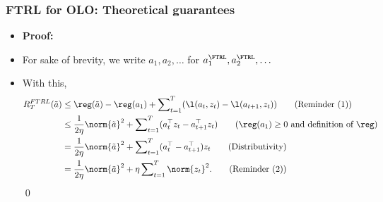 \documentclass[11pt,compress,t,notes=noshow, xcolor=table]{beamer}
\begin{document}
\begin{frame} 
	\frametitle{FTRL for OLO: Theoretical guarantees}
	\small
	\begin{itemize}
		\footnotesize

		\item \textbf{Proof:}
		
		\footnotesize
			
			 \item 	For sake of brevity, we write $a_1, a_2, \ldots$ for $a_1^{\FTRL}, a_2^{\FTRL}, \ldots$ 
			\pause
			 \item With this,
			\begin{align*}
				R_T^{FTRL}(\tilde a) &\leq \reg(\tilde a) - \reg(a_1) + \sum\nolimits_{t=1}^T (\l(a_t,z_t) - \l(a_{t+1},z_t))  \tag{Reminder (1)}\\
				 &\leq \frac{1}{2\eta}  \norm{\tilde a}^2 + \sum\nolimits_{t=1}^T ( a_t^\top z_t  -  a_{t+1}^\top z_t  ) \tag{$\reg(a_1)\geq 0$ and definition of $\reg$} \\
				 &= \frac{1}{2\eta}  \norm{\tilde a}^2 + \sum\nolimits_{t=1}^T  ( a_t^\top-  a_{t+1}^\top   )z_t \tag{Distributivity} \\
				 &= \frac{1}{2\eta}  \norm{\tilde a}^2 + \eta \sum\nolimits_{t=1}^T   \norm{z_t}^2.  \tag{Reminder (2)}
			\end{align*}
			\qed
%		
	\end{itemize}
\end{frame}
\end{document}
